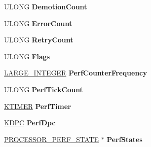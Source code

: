 \begin{DoxyCompactItemize}
U\+L\+O\+NG {\bfseries Demotion\+Count}
\item 
\mbox{\label{struct___p_r_o_c_e_s_s_o_r___p_o_w_e_r___s_t_a_t_e_ad29c728239119f3c01c46f3b79a3fdf4}} 
U\+L\+O\+NG {\bfseries Error\+Count}
\item 
\mbox{\label{struct___p_r_o_c_e_s_s_o_r___p_o_w_e_r___s_t_a_t_e_ab595c595bda358fca87d4527d7bc0aec}} 
U\+L\+O\+NG {\bfseries Retry\+Count}
\item 
\mbox{\label{struct___p_r_o_c_e_s_s_o_r___p_o_w_e_r___s_t_a_t_e_afddf14881a9f4897429f08a1d50d8f54}} 
U\+L\+O\+NG {\bfseries Flags}
\item 
\mbox{\label{struct___p_r_o_c_e_s_s_o_r___p_o_w_e_r___s_t_a_t_e_a27333e02c8c2290913581712ec318687}} 
\hyperlink{union___l_a_r_g_e___i_n_t_e_g_e_r}{L\+A\+R\+G\+E\+\_\+\+I\+N\+T\+E\+G\+ER} {\bfseries Perf\+Counter\+Frequency}
\item 
\mbox{\label{struct___p_r_o_c_e_s_s_o_r___p_o_w_e_r___s_t_a_t_e_a5e6f8a05f9e175cf36ca46d9d6b7b189}} 
U\+L\+O\+NG {\bfseries Perf\+Tick\+Count}
\item 
\mbox{\label{struct___p_r_o_c_e_s_s_o_r___p_o_w_e_r___s_t_a_t_e_a2ec501abc4924fefdb43c10a9d4d15c5}} 
\hyperlink{struct___k_t_i_m_e_r}{K\+T\+I\+M\+ER} {\bfseries Perf\+Timer}
\item 
\mbox{\label{struct___p_r_o_c_e_s_s_o_r___p_o_w_e_r___s_t_a_t_e_a443a94b157026dcbf2189c665522d3ae}} 
\hyperlink{struct___k_d_p_c}{K\+D\+PC} {\bfseries Perf\+Dpc}
\item 
\mbox{\label{struct___p_r_o_c_e_s_s_o_r___p_o_w_e_r___s_t_a_t_e_a02be6fd9e1f3e30acd62f28d74c5b3f7}} 
\hyperlink{struct___p_r_o_c_e_s_s_o_r___p_e_r_f___s_t_a_t_e}{P\+R\+O\+C\+E\+S\+S\+O\+R\+\_\+\+P\+E\+R\+F\+\_\+\+S\+T\+A\+TE} $\ast$ {\bfseries Perf\+States}
\item 

\end{DoxyCompactItemize}

